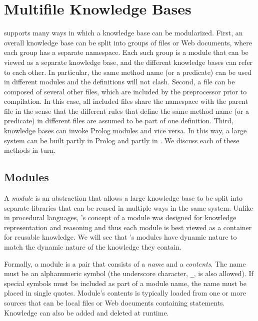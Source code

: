 \documentclass[11pt]{article}
\newcommand{\ERGO}{\mbox{\smaller{\ensuremath{\cal{E}}\smaller{{\sc{RGO}}}}}\xspace}
\newcommand{\FLSYSTEM}{\ERGO}
\begin{document}
\section{Multifile Knowledge Bases}

\FLSYSTEM supports many ways in which a knowledge base can be modularized.
First, an overall knowledge base
can be split into groups of files or Web documents, where each
group has a separate namespace. Each
such group is a module that
can be viewed as a separate knowledge base, and the different
knowledge bases can refer to
each other. In particular, the same method name (or a
predicate) can be used in different modules and the definitions will not
clash.  Second, a file can be composed of several other files, which
are included by the preprocessor prior to compilation. In this
case, all included files share the namespace with the parent file
in the sense that the different
rules that define the same method name (or a predicate) in different files
are assumed to be part of one definition. Third, \FLSYSTEM knowledge bases
can invoke
Prolog modules and vice versa. In this way, a large system can be built partly
in Prolog and partly in \FLSYSTEM.
We discuss each of these methods in turn.


\subsection{\FLSYSTEM Modules} \label{sec:flora-modules}

A \emph{\FLSYSTEM module} is an abstraction that allows a large knowledge
base to be split into separate libraries that can be reused in multiple
ways in the same system.  Unlike in procedural languages, \FLSYSTEM's
concept of a module was designed for knowledge representation and reasoning
and thus each module is best viewed as a container for reusable knowledge.
We will see that \FLSYSTEM's modules have dynamic nature to match the
dynamic nature of the knowledge they contain.

Formally, a module is a pair that consists of a
\emph{name} and a \emph{contents}. The name must be an alphanumeric symbol
(the underscore character, {\tt \_}, is also allowed). If special symbols
must be included as part of a module name, the name must be placed in single
quotes.
Module's contents
is typically loaded from one or more sources that
can be local files or Web documents containing \FLSYSTEM statements. Knowledge can also be added and
deleted at runtime.
\end{document}
